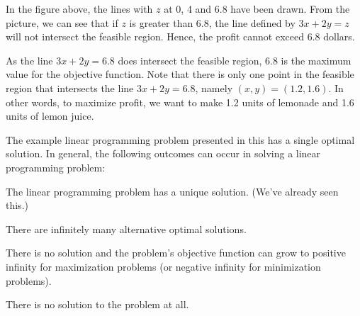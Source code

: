\begin{solution}
\begin{center}
\end{center}


%
%
%
%
%

In the figure above, the lines with \(z\) at 0, 4 and 6.8 have been
drawn. From the picture, we can see that if \(z\) is greater than 6.8,
the line defined by \(3x+2y = z\) will not intersect the feasible
region. Hence, the profit cannot exceed 6.8 dollars.

As the line \(3x+2y = 6.8\) does intersect the feasible region, \(6.8\)
is the maximum value for the objective function. Note that there is only
one point in the feasible region that intersects the line \(3x+2y=6.8\),
namely $(x,y) = (1.2,1.6)$.
In other words, to maximize profit, we want to make 1.2 units of
lemonade and 1.6 units of lemon juice.
\end{solution}





The example linear programming problem presented in this has a single optimal solution. In general, the following outcomes can occur in solving a linear programming problem: 
\begin{enumerate*}
\item The linear programming problem has a unique solution. (We've already seen this.)
\item There are infinitely many alternative optimal solutions.
\item There is no solution and the problem's objective function can grow to positive infinity for maximization problems (or negative infinity for minimization problems). 
\item There is no solution to the problem at all. 
\end{enumerate*}

